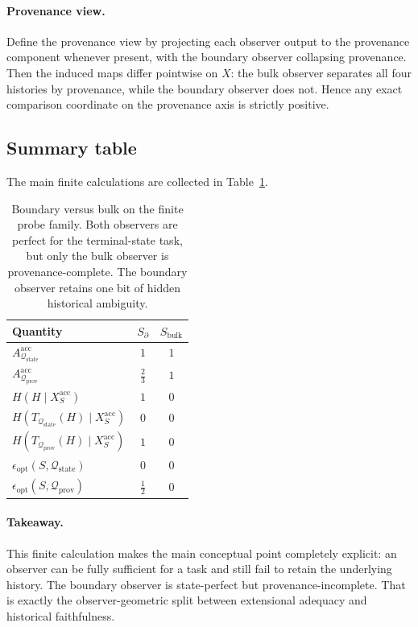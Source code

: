 \documentclass[11pt,twoside]{article}
\newcommand{\TableHeaderRow}{\rowcolor{tableheaderbg}\bfseries}
\theoremstyle{definition}
\newcommand{\acc}{\mathrm{acc}}
\newcommand{\bulk}{\mathrm{bulk}}
\begin{document}
\paragraph{Provenance view.}
Define the provenance view by projecting each observer output to the provenance component whenever present, with the boundary observer collapsing provenance. Then the induced maps differ pointwise on \(X\): the bulk observer separates all four histories by provenance, while the boundary observer does not. Hence any exact comparison coordinate on the provenance axis is strictly positive.

\subsection{Summary table}
\label{app:boundary-bulk-summary}

The main finite calculations are collected in Table~\ref{tab:boundary-bulk-summary}.

\begin{table}[t]
\centering
\begin{tabular}{lcc}
\toprule
\TableHeaderRow
Quantity & \(S_{\partial}\) & \(S_{\bulk}\) \\
\midrule
\(A^{\acc}_{\mathcal{Q}_{\mathrm{state}}}\) & \(1\) & \(1\) \\
\(A^{\acc}_{\mathcal{Q}_{\mathrm{prov}}}\)  & \(\frac23\) & \(1\) \\
\(H(H\mid X_S^{\acc})\) & \(1\) & \(0\) \\
\(H(T_{\mathcal{Q}_{\mathrm{state}}}(H)\mid X_S^{\acc})\) & \(0\) & \(0\) \\
\(H(T_{\mathcal{Q}_{\mathrm{prov}}}(H)\mid X_S^{\acc})\) & \(1\) & \(0\) \\
\(\epsilon_{\mathrm{opt}}(S,\mathcal{Q}_{\mathrm{state}})\) & \(0\) & \(0\) \\
\(\epsilon_{\mathrm{opt}}(S,\mathcal{Q}_{\mathrm{prov}})\) & \(\frac12\) & \(0\) \\
\bottomrule
\end{tabular}
\caption{Boundary versus bulk on the finite probe family. Both observers are perfect for the terminal-state task, but only the bulk observer is provenance-complete. The boundary observer retains one bit of hidden historical ambiguity.}
\label{tab:boundary-bulk-summary}
\end{table}

\paragraph{Takeaway.}
This finite calculation makes the main conceptual point completely explicit: an observer can be fully sufficient for a task and still fail to retain the underlying history. The boundary observer is state-perfect but provenance-incomplete. That is exactly the observer-geometric split between extensional adequacy and historical faithfulness.
\end{document}
